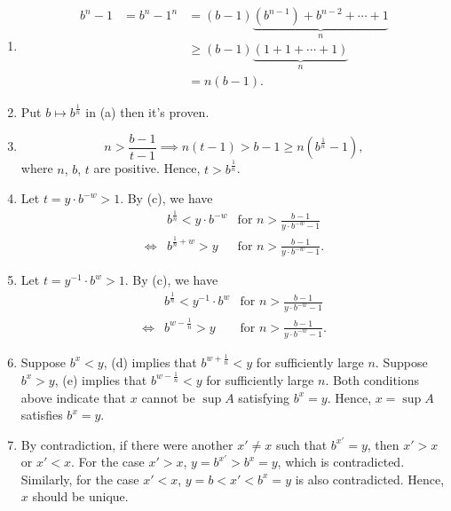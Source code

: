 \documentclass[a4pap er]{article}
\theoremstyle{plain}
\begin{document}
\begin{enumerate}[label = (\alph*)]
\item 
\[
    \begin{array}{RRL}
    b^n - 1 & = b^n - 1^ n & = (b-1)\underbrace{(b^{n-1}) + b^{n-2} + \cdots + 1}_{n} \\
        & & \geq (b-1)\underbrace{(1 + 1 + \cdots + 1)}_{n} \\
        & &= n(b-1).
    \end{array}
\]
\item Put $b \mapsto b^{\frac{1}{n}}$ in (a) then it's proven.
\item 
    \[
        n > \frac{b-1}{t-1} \implies n(t-1) > b-1 
        \geq n(b^{\frac{1}{n}} - 1),
    \]
    where $n,\, b,\, t$ are positive. Hence, $t > b^{\frac{1}{n}}$.
\item
    Let $t = y\cdot b^{-w} > 1$. By (c), we have
\[
    \begin{array}{RLL}
        & b^{\frac{1}{n}} < y \cdot b^{-w} & \text{for } n > \frac{b-1}{y\cdot b^{-w}-1} \\
        \iff & b^{\frac{1}{n}+w} > y & \text{for } n > \frac{b-1}{y\cdot b^{-w}-1}.
    \end{array}
\]
\item
    Let $t = y^{-1}\cdot b^w > 1$. By (c), we have 
    \[
        \begin{array}{RLL}
            & b^{\frac{1}{n}} < y^{-1}\cdot b^w & \text{for } n > \frac{b-1}{y\cdot b^{-w}-1} \\
            \iff & b^{w-\frac{1}{n}} > y & \text{for } n > \frac{b-1}{y\cdot b^{-w}-1}.
        \end{array}
    \]
\item Suppose $b^x < y$, (d) implies that $b^{w+\frac{1}{n}}
    < y$ for sufficiently large $n$. 
    Suppose $b^x > y$, (e) implies that $b^{w - \frac{1}{n}}
    < y$ for sufficiently large $n$.
Both conditions above indicate that $x$ cannot be $\sup A$
satisfying $b^x = y$.
    Hence, $x = \sup A$ satisfies $b^x=y$.
\item
By contradiction, if there were another $x' \neq x$
such that $b^{x'} = y$, then $x'>x$ or $x'<x$.
For the case $x'>x$, $y=b^{x'} > b^x = y$, which is contradicted. 
Similarly, for the case $x' < x$, $y=b<{x'} < b^x=y$ is also
contradicted. Hence, $x$ should be unique.
\end{enumerate}
\end{document}
